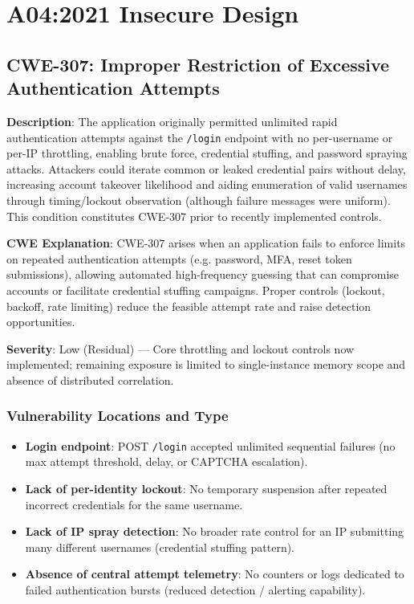 \documentclass[]{UCD_CS_FYP_Report}
\begin{document}
\chapter{A04:2021 Insecure Design}


\section{CWE-307: Improper Restriction of Excessive Authentication Attempts}

	\textbf{Description}: The application originally permitted unlimited rapid authentication attempts against the \texttt{/login} endpoint with no per-username or per-IP throttling, enabling brute force, credential stuffing, and password spraying attacks. Attackers could iterate common or leaked credential pairs without delay, increasing account takeover likelihood and aiding enumeration of valid usernames through timing/lockout observation (although failure messages were uniform). This condition constitutes CWE-307 prior to recently implemented controls.

	\textbf{CWE Explanation}: CWE-307 arises when an application fails to enforce limits on repeated authentication attempts (e.g. password, MFA, reset token submissions), allowing automated high-frequency guessing that can compromise accounts or facilitate credential stuffing campaigns. Proper controls (lockout, backoff, rate limiting) reduce the feasible attempt rate and raise detection opportunities.

	\textbf{Severity}: Low (Residual) — Core throttling and lockout controls now implemented; remaining exposure is limited to single-instance memory scope and absence of distributed correlation.

\subsection*{Vulnerability Locations and Type}
\begin{itemize}
	\item \textbf{Login endpoint}: POST \texttt{/login} accepted unlimited sequential failures (no max attempt threshold, delay, or CAPTCHA escalation).
	\item \textbf{Lack of per-identity lockout}: No temporary suspension after repeated incorrect credentials for the same username.
	\item \textbf{Lack of IP spray detection}: No broader rate control for an IP submitting many different usernames (credential stuffing pattern).
	\item \textbf{Absence of central attempt telemetry}: No counters or logs dedicated to failed authentication bursts (reduced detection / alerting capability).
\end{itemize}
\end{document}
